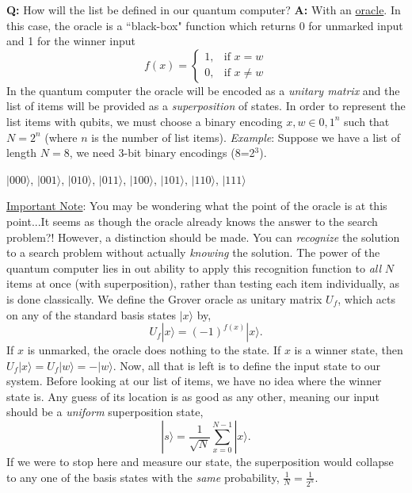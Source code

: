 \documentclass[11pt]{article} %
\begin{document}
\noindent \textbf{Q:} How will the list be defined in our quantum computer?
\newline
\noindent \textbf{A:} With an \underline{oracle}.
\newline
\newline
In this case, the oracle is a ``black-box" function which returns 0 for unmarked input and 1 for the winner input
\[
    f(x)= 
\begin{cases}
    1, & \text{if } x=w\\
    0, & \text{if } x\neq w
\end{cases}
\]
In the quantum computer the oracle will be encoded as a \textit{unitary matrix} and the list of items will be provided as a \textit{superposition} of states. In order to 
represent the list items with qubits, we must choose a binary encoding $x,w \in {0,1}^n$ such that $N=2^n$ (where $n$ is the number of list items).
\newline
\newline
\textit{Example}: Suppose we have a list of length $N=8$, we need 3-bit binary encodings (8=2$^3$).
\centerline{$|000\rangle$, $|001\rangle$, $|010\rangle$, $|011\rangle$, $|100\rangle$, $|101\rangle$, $|110\rangle$, $|111\rangle$}
\newline
\newline
\underline{Important Note}: You may be wondering what the point of the oracle is at this point...It seems as though the oracle already knows the answer to the search problem?! However, a distinction should be made. You can \textit{recognize} the solution to a search problem without actually \textit{knowing} the solution. The power of the quantum computer lies in out ability to apply this recognition function to \textit{all} $N$ items at once (with superposition), rather than testing each item individually, as is done classically.
\newline
\newline
We define the Grover oracle as unitary matrix $U_f$, which acts on any of the standard basis states $|x\rangle$ by,
\begin{equation*}
    U_f|x\rangle=(-1)^{f(x)}|x\rangle.
\end{equation*}
If $x$ is unmarked, the oracle does nothing to the state. If $x$ is a winner state, then $U_f|x\rangle=U_f|w\rangle=-|w\rangle$.
\newline
\newline
Now, all that is left is to define the input state to our system. Before looking at our list of items, we have no idea where the winner state is. Any guess of its location is as good as any other, meaning our input should be a \textit{uniform} superposition state,
\begin{equation*}
    |s\rangle = \frac{1}{\sqrt{N}}\sum_{x=0}^{N-1}|x\rangle.
\end{equation*}
If we were to stop here and measure our state, the superposition would collapse to any one of the basis states with the \textit{same} probability, $\frac{1}{N}=\frac{1}{2^n}$.
\end{document}
